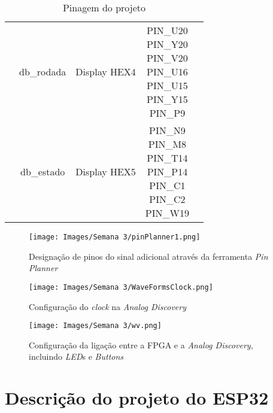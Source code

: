 \documentclass[amsmath,amssymb,floatfix]{report}
\begin{document}
\begin{table}[H]
\begin{tabular}{c|c|c|c|c|}
\multicolumn{1}{|c|}{}                           & db\_rodada              & Display HEX4         & \thead{PIN\_U20\\ PIN\_Y20\\ PIN\_V20\\ PIN\_U16\\ PIN\_U15\\ PIN\_Y15\\ PIN\_P9}                                                                                                     & \multicolumn{1}{l|}{}          \\ \cline{2-5} 
\multicolumn{1}{|c|}{}                           & db\_estado              & Display HEX5 & \thead{PIN\_N9 \\ PIN\_M8 \\ PIN\_T14 \\  PIN\_P14 \\  PIN\_C1 \\ PIN\_C2 \\ PIN\_W19}                                                                       & \multicolumn{1}{l|}{}          \\ \hline
\end{tabular}
\caption{Pinagem do projeto}
\label{tab:pinagemFPGA3}
\end{table}

\begin{figure}[H]
\centering
\texttt{[image: Images/Semana 3/pinPlanner1.png]}
    \caption{Designação de pinos do sinal adicional através da ferramenta \textit{Pin Planner}}
    \label{fig:pinPlanner31}
\end{figure}

\begin{figure}[H]
\centering
\texttt{[image: Images/Semana 3/WaveFormsClock.png]}
    \caption{Configuração do \textit{clock} na \textit{Analog Discovery}}
    \label{fig:wfClock3}
\end{figure}

\begin{figure}[H]
\centering
\texttt{[image: Images/Semana 3/wv.png]} 
    \caption{Configuração da ligação entre a FPGA e a \textit{Analog Discovery}, incluindo \textit{LED}s e \textit{Buttons}}
    \label{fig:wv3}
\end{figure}

\section{Descrição do projeto do ESP32}
\label{sec:esp32projetodescricao3}
\end{document}
